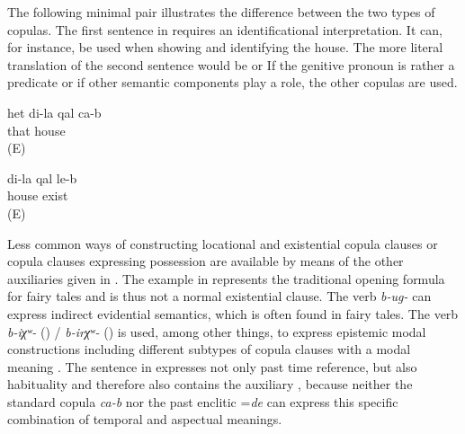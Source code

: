 The following minimal pair illustrates the difference between the two types of copulas. The first sentence in  requires an identificational interpretation. It can, for instance, be used when showing and identifying the house. The more literal translation of the second sentence  would be  or  If the genitive pronoun is rather a predicate  or if other semantic components play a role, the other copulas are used. 
%
\begin{exe}
	\ex	\label{ex:That is my house}
	\gll	het	di-la	qal	ca-b\\
		that 	house	\\
	\glt	{} (E)

	\ex	\label{ex:I have a house}
	\gll	di-la	qal	le-b\\
			house	exist\\
	\glt	{} (E)
\end{exe}


Less common ways of constructing locational and existential copula clauses or copula clauses expressing possession are available by means of the other auxiliaries given in . The example in  represents the traditional opening formula for fairy tales and is thus not a normal existential clause. The verb \textit{b-ug-} can express indirect evidential semantics, which is often found in fairy tales. The verb \textit{b-iχʷ-} () / \textit{b-irχʷ-} ()  is used, among other things, to express epistemic modal constructions including different subtypes of copula clauses with a modal meaning . The sentence in  expresses not only past time reference, but also habituality and therefore also contains the auxiliary , because neither the standard copula \textit{ca-b} nor the past enclitic =\textit{de} can express this specific combination of temporal and aspectual meanings.

